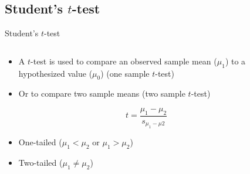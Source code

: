 \documentclass[aspectratio=169]{beamer}\usepackage[]{graphicx}\usepackage[]{color}
\begin{document}
\subsection{Student's $t$-test}
\begin{frame}{Student's $t$-test}
\begin{columns}
  \begin{column}{0.75\textwidth}
  \begin{itemize}
    \item A $t$-test is used to compare an observed sample mean ($\mu_1$) to a hypothesized value ($\mu_{0}$) (one sample $t$-test)
    \item Or to compare two sample means (two sample $t$-test)
  \end{itemize}
  \begin{equation}
  t = \frac{\mu_1 - \mu_2}{s_{\mu_1-\mu2}}
  \end{equation}
  \begin{itemize}
    \item One-tailed ($\mu_1 < \mu_2$ or $\mu_1 > \mu_2$)
    \item Two-tailed ($\mu_1 \ne \mu_2$)
  \end{itemize}
  \end{column}
  \begin{column}{0.25\textwidth}
  \begin{center}

\end{center}
\end{column}
\end{columns}
\end{frame}
\end{document}
